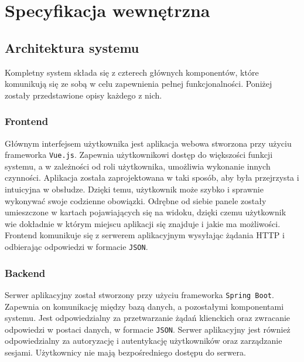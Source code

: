 \chapter{Specyfikacja wewnętrzna}
\label{ch:05}

\section{Architektura systemu}


Kompletny system składa się z czterech głównych komponentów, które komunikują się ze sobą w celu zapewnienia pełnej funkcjonalności. Poniżej zostały przedstawione opisy każdego z nich.

\subsection{Frontend}

Głównym interfejsem użytkownika jest aplikacja webowa stworzona przy użyciu frameworka \texttt{Vue.js}. Zapewnia użytkownikowi dostęp do większości funkcji systemu, a w zależności od roli użytkownika, umożliwia wykonanie innych czynności. Aplikacja została zaprojektowana w taki sposób, aby była przejrzysta i intuicyjna w obsłudze. Dzięki temu, użytkownik może szybko i sprawnie wykonywać swoje codzienne obowiązki. Odrębne od siebie panele zostały umieszczone w kartach pojawiających się na widoku, dzięki czemu użytkownik wie dokładnie w którym miejscu aplikacji się znajduje i jakie ma możliwości. Frontend komunikuje się z serwerem aplikacyjnym wysyłając żądania HTTP i odbierając odpowiedzi w formacie \texttt{JSON}.

\subsection{Backend}

Serwer aplikacyjny został stworzony przy użyciu frameworka \texttt{Spring Boot}. Zapewnia on komunikację między bazą danych, a pozostałymi komponentami systemu. Jest odpowiedzialny za przetwarzanie żądań klienckich oraz zwracanie odpowiedzi w postaci danych, w formacie \texttt{JSON}. Serwer aplikacyjny jest również odpowiedzialny za autoryzację i autentykację użytkowników oraz zarządzanie sesjami. Użytkownicy nie mają bezpośredniego dostępu do serwera.

